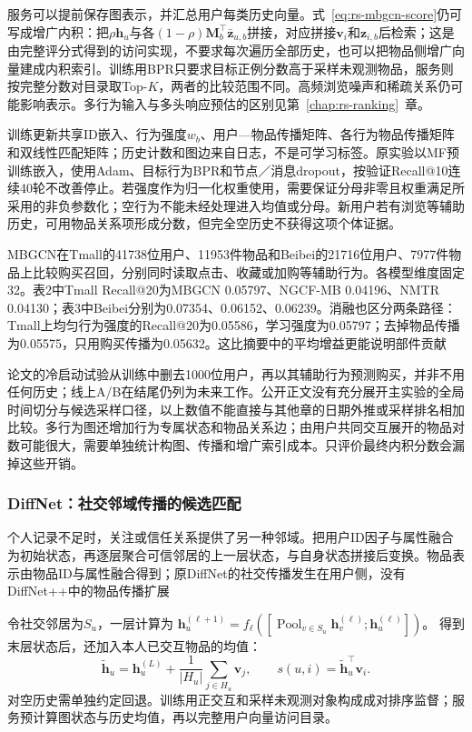服务可以提前保存图表示，并汇总用户每类历史向量。式~\eqref{eq:rs-mbgcn-score}仍可写成增广内积：把$\rho\bm h_u$与各$(1-\rho)\bm M_b^\top\bar{\bm z}_{u,b}$拼接，对应拼接$\bm v_i$和$\bm z_{i,b}$后检索；这是由完整评分式得到的访问实现，不要求每次遍历全部历史，也可以把物品侧增广向量建成内积索引。训练用BPR只要求目标正例分数高于采样未观测物品，服务则按完整分数对目录取Top-$K$，两者的比较范围不同。高频浏览噪声和稀疏关系仍可能影响表示。多行为输入与多头响应预估的区别见第~\ref{chap:rs-ranking}~章。

训练更新共享ID嵌入、行为强度$w_b$、用户—物品传播矩阵、各行为物品传播矩阵和双线性匹配矩阵；历史计数和图边来自日志，不是可学习标签。原实验以MF预训练嵌入，使用Adam、目标行为BPR和节点／消息dropout，按验证Recall@10连续40轮不改善停止。若强度作为归一化权重使用，需要保证分母非零且权重满足所采用的非负参数化；空行为不能未经处理进入均值或分母。新用户若有浏览等辅助历史，可用物品关系项形成分数，但完全空历史不获得这项个体证据。

MBGCN在Tmall的41738位用户、11953件物品和Beibei的21716位用户、7977件物品上比较购买召回，分别同时读取点击、收藏或加购等辅助行为。各模型维度固定32。表2中Tmall Recall@20为MBGCN 0.05797、NGCF-MB 0.04196、NMTR 0.04130；表3中Beibei分别为0.07354、0.06152、0.06239。消融也区分两条路径：Tmall上均匀行为强度的Recall@20为0.05586，学习强度为0.05797；去掉物品传播为0.05575，只用购买传播为0.05632。这比摘要中的平均增益更能说明部件贡献

论文的冷启动试验从训练中删去1000位用户，再以其辅助行为预测购买，并非不用任何历史；线上A/B在结尾仍列为未来工作。公开正文没有充分展开主实验的全局时间切分与候选采样口径，以上数值不能直接与其他章的日期外推或采样排名相加比较。多行为图还增加行为专属状态和物品关系边；由用户共同交互展开的物品对数可能很大，需要单独统计构图、传播和增广索引成本。只评价最终内积分数会漏掉这些开销。

\Needspace{90mm}
\subsubsection{DiffNet：社交邻域传播的候选匹配}
\label{sec:rs-diffnet}

个人记录不足时，关注或信任关系提供了另一种邻域。把用户ID因子与属性融合为初始状态，再逐层聚合可信邻居的上一层状态，与自身状态拼接后变换。物品表示由物品ID与属性融合得到；原DiffNet的社交传播发生在用户侧，没有DiffNet++中的物品传播扩展

令社交邻居为$S_u$，一层计算为
$\bm h_u^{(\ell+1)}=f_\ell([\operatorname{Pool}_{v\in S_u}\bm h_v^{(\ell)};\bm h_u^{(\ell)}])$。
得到末层状态后，还加入本人已交互物品的均值：
\begin{equation}
 \widetilde{\bm h}_u=\bm h_u^{(L)}
       +\frac1{|H_u|}\sum_{j\in H_u}\bm v_j,\qquad
 s(u,i)=\widetilde{\bm h}_u^\top\bm v_i.
 \label{eq:rs-diffnet}
\end{equation}
对空历史需单独约定回退。训练用正交互和采样未观测对象构成成对排序监督；服务预计算图状态与历史均值，再以完整用户向量访问目录。

